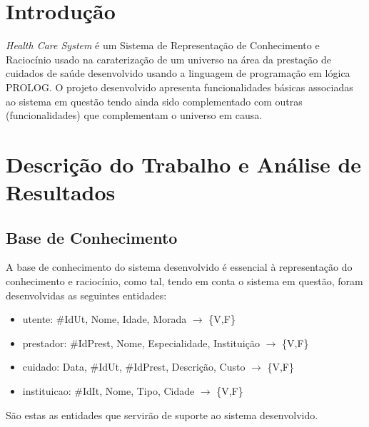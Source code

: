\documentclass{article}
\begin{document}
\newpage

\vspace*{\fill}
\tableofcontents
\vspace*{\fill}

\newpage

\vspace*{\fill}
\section{Introdução}
\textit{Health Care System} é um Sistema de Representação de Conhecimento e Raciocínio usado na caraterização de um universo na área da prestação de cuidados de saúde desenvolvido usando a linguagem de programação em lógica PROLOG. O projeto desenvolvido apresenta funcionalidades básicas associadas ao sistema em questão tendo ainda sido complementado com outras (funcionalidades) que complementam o universo em causa.
\vspace*{\fill}

\newpage

\section{Descrição do Trabalho e Análise de Resultados}

\subsection{Base de Conhecimento}
A base de conhecimento do sistema desenvolvido é essencial à representação do conhecimento e raciocínio, como tal, tendo em conta o sistema em questão, foram desenvolvidas as seguintes entidades:
\begin{itemize}
	\item utente: \#IdUt, Nome, Idade, Morada $\to$ \{V,F\}
    \item prestador: \#IdPrest, Nome, Especialidade, Instituição $\to$ \{V,F\}
    \item cuidado: Data, \#IdUt, \#IdPrest, Descrição, Custo $\to$ \{V,F\}
    \item instituicao: \#IdIt, Nome, Tipo, Cidade $\to$ \{V,F\}
\end{itemize}
São estas as entidades que servirão de suporte ao sistema desenvolvido.
\end{document}
